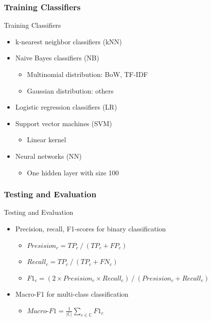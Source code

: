 \documentclass[mathserif]{beamer}
\DeclareMathOperator*{\divby}{/}
\begin{document}
\subsubsection{Training Classifiers}
\begin{frame}{Training Classifiers}
	\begin{itemize}
	\item k-nearest neighbor classifiers (kNN)
	\item Naive Bayes classifiers (NB)
		\begin{itemize}
		\item Multinomial distribution: BoW, TF-IDF
		\item Gaussian distribution: others
		\end{itemize}
	\item Logistic regression classifiers (LR)
	\item Support vector machines (SVM)
		\begin{itemize}
		\item Linear kernel
		\end{itemize}
	\item Neural networks (NN)
		\begin{itemize}
		\item One hidden layer with size 100
		\end{itemize}
	\end{itemize}
\end{frame}

\subsubsection{Testing and Evaluation}
\begin{frame}{Testing and Evaluation}
	\begin{itemize}
	\item Precision, recall, F1-scores for binary classification
		\begin{itemize}
		\item $Presision_c = TP_c \divby (TP_c+FP_c)$
		\item[] $Recall_c = TP_c \divby (TP_c+FN_c)$
		\item[] $F1_c = (2 \times Presision_c \times Recall_c) \divby (Presision_c+Recall_c)$
		\end{itemize}
	\item Macro-F1 for multi-class classification
		\begin{itemize}
		\item $Macro\text{-}F1 = \frac{1}{|\mathbb{C}|} \sum_{c \in \mathbb{C}} F1_c$
		\end{itemize}
	\end{itemize}
	
\end{frame}
\end{document}

